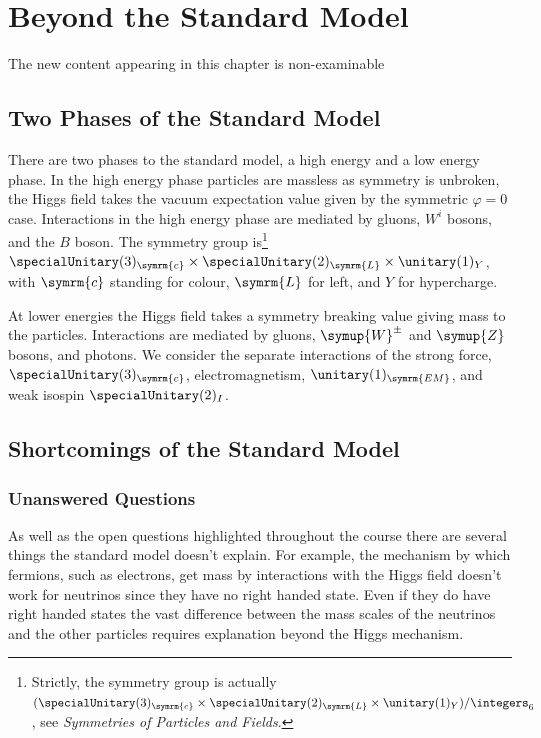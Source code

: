\documentclass[fleqn]{NotesClass}
\newcommand{\Pparticle}[1]{\symup{#1}}
\newcommand{\PZ}{\ensuremath{\Pparticle{Z}}}
\newcommand{\PWpm}{\ensuremath{\Pparticle{W}^{\pm}}}
\newcommand{\course}[1]{\textit{#1}}
\newcommand{\Left}{\symrm{L}}
\begin{document}
    
    \chapter{Beyond the Standard Model}
    \begin{rmk}
        The new content appearing in this chapter is non-examinable
    \end{rmk}
    
    \section{Two Phases of the Standard Model}
    There are two phases to the standard model, a high energy and a low energy phase.
    In the high energy phase particles are massless as symmetry is unbroken, the Higgs field takes the vacuum expectation value given by the symmetric \(\varphi = 0\) case.
    Interactions in the high energy phase are mediated by gluons, \(W^i\) bosons, and the \(B\) boson.
    The symmetry group is\footnote{Strictly, the symmetry group is actually \((\specialUnitary(3)_{\symrm{c}} \times \specialUnitary(2)_{\Left} \times \unitary(1)_{Y}) / \integers_6\), see \course{Symmetries of Particles and Fields}.} \(\specialUnitary(3)_{\symrm{c}} \times \specialUnitary(2)_{\Left} \times \unitary(1)_{Y}\), with \(\symrm{c}\) standing for colour, \(\Left\) for left, and \(Y\) for hypercharge.
    
    At lower energies the Higgs field takes a symmetry breaking value giving mass to the particles.
    Interactions are mediated by gluons, \PWpm{} and \PZ{} bosons, and photons.
    We consider the separate interactions of the strong force, \(\specialUnitary(3)_{\symrm{c}}\), electromagnetism, \(\unitary(1)_{\symrm{EM}}\), and weak isospin \(\specialUnitary(2)_{I}\).
    
    \section{Shortcomings of the Standard Model}
    \subsection{Unanswered Questions}
    As well as the open questions highlighted throughout the course there are several things the standard model doesn't explain.
    For example, the mechanism by which fermions, such as electrons, get mass by interactions with the Higgs field doesn't work for neutrinos since they have no right handed state.
    Even if they do have right handed states the vast difference between the mass scales of the neutrinos and the other particles requires explanation beyond the Higgs mechanism.
    
\end{document}

